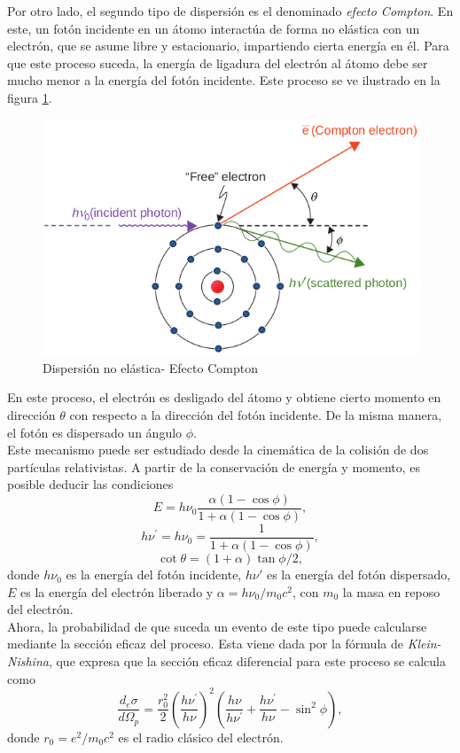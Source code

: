 Por otro lado, el segundo tipo de dispersión es el denominado \textit{efecto Compton}. En este, un fotón incidente en un átomo interactúa de forma no elástica con un electrón, que se asume libre y estacionario, impartiendo cierta energía en él. Para que este proceso suceda, la energía de ligadura del electrón al átomo debe ser mucho menor a la energía del fotón incidente. Este proceso se ve ilustrado en la figura \ref{fig:compton}.\\
\begin{figure}[H]
	\centering
	\includegraphics[width=0.7\linewidth]{images/compton.png}
	\caption{Dispersión no elástica- Efecto Compton \cite{khan2014the}}
	\label{fig:compton}
\end{figure}
En este proceso, el electrón es desligado del átomo y obtiene cierto momento en dirección $\theta$ con respecto a la dirección del fotón incidente. De la misma manera, el fotón es dispersado un ángulo $\phi$. \\

Este mecanismo puede ser estudiado desde la cinemática de la colisión de dos partículas relativistas. A partir de la conservación de energía y momento, es posible deducir las condiciones 
\begin{equation}
E=h \nu_{0} \frac{\alpha(1-\cos \phi)}{1+\alpha(1-\cos \phi)},
\end{equation}
\begin{equation}
h \nu^{\prime}=h \nu_{0}=\frac{1}{1+\alpha(1-\cos \phi)},
\end{equation}
\begin{equation}
\cot \theta=(1+\alpha) \tan \phi / 2,
\end{equation}
donde $h\nu_0$ es la energía del fotón incidente, $h\nu'$ es la energía del fotón dispersado, $E$ es la energía del electrón liberado y $\alpha=h\nu_0/m_0c^2$, con $m_0$ la masa en reposo del electrón. \\

Ahora, la probabilidad de que suceda un evento de este tipo puede calcularse mediante la sección eficaz del proceso. Esta viene dada por la fórmula de \textit{Klein-Nishina}, que expresa que la sección eficaz diferencial para este proceso se calcula como
\begin{equation}
\label{eqn:KleinNishina}
\frac{d_{e} \sigma}{d \Omega_{p}}=\frac{r_{0}^{2}}{2}\left(\frac{h \nu^{\prime}}{h \nu}\right)^{2}\left(\frac{h \nu}{h \nu^{\prime}}+\frac{h \nu^{\prime}}{h \nu}-\sin ^{2} \phi\right),
\end{equation}
donde $r_0=e^2/m_0c^2$ es el radio clásico del electrón\cite{Weinberg1995}.\\


